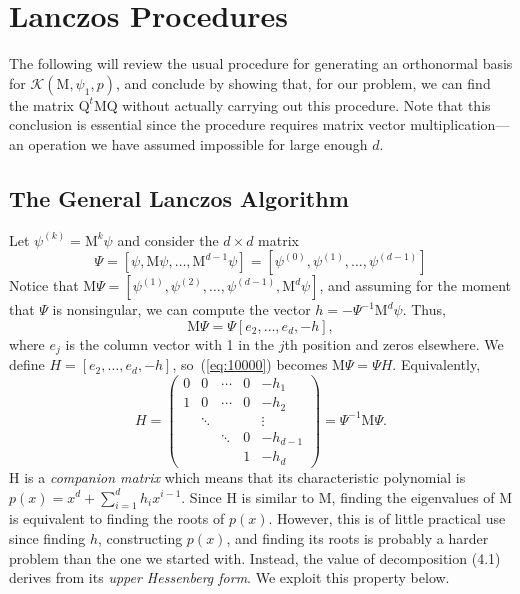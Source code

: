 \documentclass[12pt,letterpaper]{report}
\theoremstyle{plain}
\theoremstyle{definition}
\theoremstyle{remark}
\numberwithin{theorem}{chapter}
\numberwithin{claim}{chapter}
\numberwithin{equation}{chapter}
\numberwithin{conjecture}{chapter}
\newcommand\sK{\ensuremath{\mathcal{K}}}
\newcommand\M{\ensuremath{\mathrm{M}}}
\renewcommand\H{\ensuremath{\mathrm{H}}}
\newcommand\Q{\ensuremath{\mathrm{Q}}}
\newcommand\psip[1]{\ensuremath{\psi^{(#1)}}}
\newcommand\<{\ensuremath{\langle}}
\renewcommand\>{\ensuremath{\rangle}}
\begin{document}
\chapter{Lanczos Procedures}
\label{cha:lanczos-procedures}
The following will review the usual procedure for generating an orthonormal basis for
$\sK(\M, \psi_1, p)$, 
and conclude by showing that, for our problem, we can find the matrix 
$\Q^t\M\Q$
without actually carrying out this procedure. Note that this conclusion is essential since the procedure
requires matrix vector multiplication---an operation we have assumed impossible for large enough $d$.

\section{The General Lanczos Algorithm}
\label{sec:gener-lancz-algor}
Let $\psip{k} =  \M^k \psi$ and consider the $d\times d$ matrix
\[
\Psi = [\psi, \M\psi, \dots, \M^{d-1}\psi] = [\psip{0}, \psip{1}, \dots, \psip{d-1}]
\]
Notice that $\M\Psi = [\psip{1}, \psip{2}, \dots, \psip{d-1}, \M^d \psi]$,
and assuming for the moment that $\Psi$ is nonsingular,
we can compute the vector $h = -\Psi^{-1}\M^d \psi$. Thus,
\begin{equation}
\label{eq:10000}
\M\Psi = \Psi [e_2,\dots,e_d,-h],  
\end{equation}
where $e_j$ is the column vector with 1 in
the $j$th position and zeros elsewhere. We define $H = [e_2,\dots,e_d,-h]$,
so~(\ref{eq:10000}) becomes $\M\Psi = \Psi H$.
%
%
%
%
Equivalently,
\begin{equation}
  \label{eq:4.1}
H = 
\begin{pmatrix}
0 & 0      & \cdots & 0 & -h_1 \\
1 & 0      & \cdots & 0 & -h_2\\
  & \ddots &        &   & \vdots \\
  &        & \ddots & 0 & -h_{d-1}\\
  &        &        & 1 & -h_{d}
\end{pmatrix} = \Psi^{-1} \M \Psi.
\end{equation}
$\H$ is a \emph{companion matrix} which means that its characteristic polynomial
is $p(x) = x^d + \sum_{i=1}^d h_i x^{i-1}$.
Since $\H$ is similar to $\M$, finding the eigenvalues of $\M$ is equivalent to
finding the roots of $p(x)$. However, this is of little practical use since
finding $h$, constructing $p(x)$, and finding its roots is 
probably a harder problem than the one we started with. Instead, the value of decomposition (4.1)
derives from its \emph{upper Hessenberg form}. We exploit this property below.
\end{document}
